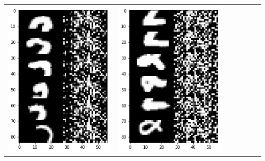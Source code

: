\documentclass[12pt]{report} %
\begin{document}
\begin{tabular}{m{0.7cm}m{2.4cm}m{2.4cm}m{2.4cm}m{2.4cm}m{2.4cm}m{2.4cm}}
	\includegraphics[scale=0.3]{pictures/M2_2_up.png} & \includegraphics[scale=0.3]{pictures/M2_2_down.png}\\

\end{tabular}
\end{document}
